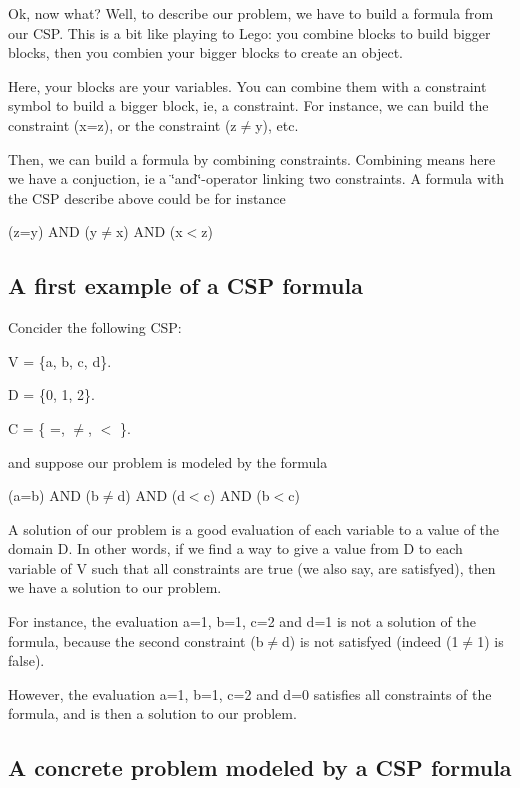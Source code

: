 Ok, now what? Well, to describe our problem, we have to build a formula from our C\+SP. This is a bit like playing to Lego\+: you combine blocks to build bigger blocks, then you combien your bigger blocks to create an object.

Here, your blocks are your variables. You can combine them with a constraint symbol to build a bigger block, ie, a constraint. For instance, we can build the constraint (x=z), or the constraint (z{$\ne$}y), etc.

Then, we can build a formula by combining constraints. Combining means here we have a conjuction, ie a \char`\"{}and\char`\"{}-\/operator linking two constraints. A formula with the C\+SP describe above could be for instance

(z=y) A\+ND (y{$\ne$}x) A\+ND (x$<$z)

\subsection*{A first example of a C\+SP formula }

Concider the following C\+SP\+:


\begin{DoxyItemize}
\item V = \{a, b, c, d\}.
\item D = \{0, 1, 2\}.
\item C = \{ =, {$\ne$}, $<$ \}.
\end{DoxyItemize}

and suppose our problem is modeled by the formula

(a=b) A\+ND (b{$\ne$}d) A\+ND (d$<$c) A\+ND (b$<$c)

A solution of our problem is a good evaluation of each variable to a value of the domain D. In other words, if we find a way to give a value from D to each variable of V such that all constraints are true (we also say, are satisfyed), then we have a solution to our problem.

For instance, the evaluation a=1, b=1, c=2 and d=1 is not a solution of the formula, because the second constraint (b{$\ne$}d) is not satisfyed (indeed (1{$\ne$}1) is false).

However, the evaluation a=1, b=1, c=2 and d=0 satisfies all constraints of the formula, and is then a solution to our problem.

\subsection*{A concrete problem modeled by a C\+SP formula }

